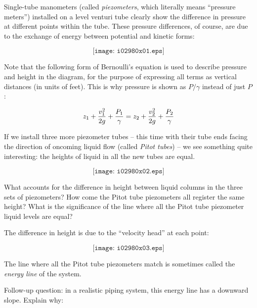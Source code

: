 

Single-tube manometers (called {\it piezometers}, which literally means ``pressure meters'') installed on a level venturi tube clearly show the difference in pressure at different points within the tube.  These pressure differences, of course, are due to the exchange of energy between potential and kinetic forms:

$$\texttt{[image: i02980x01.eps]}$$

Note that the following form of Bernoulli's equation is used to describe pressure and height in the diagram, for the purpose of expressing all terms as vertical distances (in units of feet).  This is why pressure is shown as $P / \gamma$ instead of just $P$:

$$z_1 + {v_1^2 \over {2 g}} + {P_1 \over \gamma} = z_2 + {v_2^2 \over {2 g}} + {P_2 \over \gamma}$$

If we install three more piezometer tubes -- this time with their tube ends facing the direction of oncoming liquid flow (called {\it Pitot tubes}) -- we see something quite interesting: the heights of liquid in all the new tubes are equal.

$$\texttt{[image: i02980x02.eps]}$$

What accounts for the difference in height between liquid columns in the three sets of piezometers?  How come the Pitot tube piezometers all register the same height?  What is the significance of the line where all the Pitot tube piezometer liquid levels are equal?







The difference in height is due to the ``velocity head'' at each point:

$$\texttt{[image: i02980x03.eps]}$$

The line where all the Pitot tube piezometers match is sometimes called the {\it energy line} of the system.

\vskip 10pt

Follow-up question: in a realistic piping system, this energy line has a downward slope.  Explain why:

